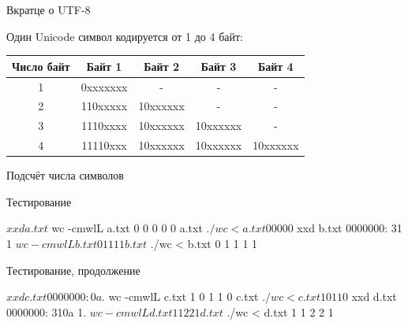 \documentclass[unknownkeysallowed,xcolor=table]{beamer}
\makeatletter
\newcommand{\srcbigsize}{\@setfontsize{\srcbigsize}{8pt}{8pt}}
\makeatother
\begin{document}
\begin{frame}{Вкратце о UTF-8}

Один Unicode символ кодируется от 1 до 4 байт:

\vspace{1em}

\begin{center}
\begin{tabular}{ c | c | c | c | c }
  \hline
    Число байт & Байт 1 & Байт 2 & Байт 3 & Байт 4 \\
  \hline
    1 & 0xxxxxxx & - & - & - \\
    2 & 110xxxxx & 10xxxxxx & - & - \\
    3 & 1110xxxx & 10xxxxxx & 10xxxxxx & - \\
    4 & 11110xxx & 10xxxxxx & 10xxxxxx & 10xxxxxx \\
\end{tabular}
\end{center}

\end{frame}

\begin{frame}[fragile]{Подсчёт числа символов}

\end{frame}

\begin{frame}[fragile]{Тестирование}

\begin{cmdline}
$ xxd a.txt
$ wc -cmwlL a.txt
0 0 0 0 0 a.txt
$ ./wc < a.txt
0	0	0	0	0

$ xxd b.txt
0000000: 31                                       1
$ wc -cmwlL b.txt
0 1 1 1 1 b.txt
$ ./wc < b.txt
0	1	1	1	1
\end{cmdline}

\end{frame}

\begin{frame}[fragile]{Тестирование, продолжение}

\begin{cmdline}
$ xxd c.txt
0000000: 0a                                       .
$ wc -cmwlL c.txt
1 0 1 1 0 c.txt
$ ./wc < c.txt
1	0	1	1	0

$ xxd d.txt
0000000: 310a                                     1.
$ wc -cmwlL d.txt
1 1 2 2 1 d.txt
$ ./wc < d.txt
1	1	2	2	1
\end{cmdline}

\end{frame}
\end{document}
